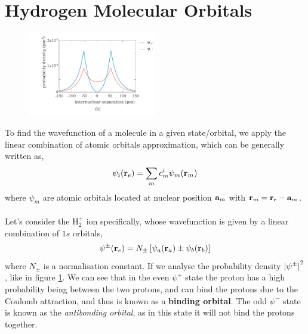 \documentclass{book}
\begin{document}
\section{Hydrogen Molecular Orbitals}
\begin{figure}
	\centering
	\includegraphics[width=0.5\textwidth]{10.4.1-b.pdf}
	\caption{}
	\label{fig:10.4.1}
\end{figure}
To find the wavefunction of a molecule in a given state/orbital, we apply the linear combination of atomic orbitals approximation, which can be generally written as,
\begin{equation}
	\psi_i(\vb{r}_e) = \sum_m c_m^i\psi_m(\vb{r}_m)
\end{equation}
where $\psi_m$ are atomic orbitals located at nuclear position $\vb{a}_m$ with $\vb{r}_m = \vb{r}_e - \vb{a}_m$.
\\\\
Let's consider the H$_2^+$ ion specifically, whose wavefunction is given by a linear combination of $1s$ orbitals,
\begin{equation}
	\psi^{\pm}(\vb{r}_e) = N_{\pm} \left[\psi_a(\vb{r}_a)\pm\psi_b(\vb{r}_b)\right]
\end{equation}
where $N_{\pm}$ is a normalisation constant. If we analyse the probability density $\abs{\psi^{\pm}}^2$, like in figure \ref{fig:10.4.1}. We can see that in the even $\psi^+$ state the proton has a high probability being between the two protons, and can bind the protons due to the Coulomb attraction, and thus is known as a \textbf{binding orbital}. The odd $\psi^-$ state is known as the \textit{antibonding orbital}, as in this state it will not bind the protons together.
\end{document}
